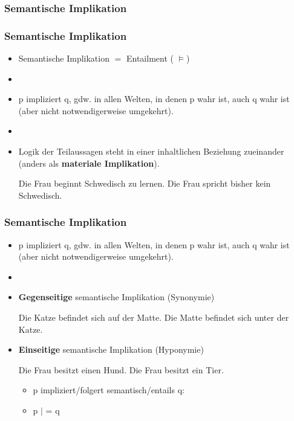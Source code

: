 %
\subsubsection{Semantische Implikation}
%

\begin{frame}
\frametitle{Semantische Implikation}

\begin{itemize}
	\item Semantische Implikation  $=$ Entailment ( $\vDash$)
	\item []
	\item p impliziert q, gdw. in allen Welten, in denen p wahr ist, auch q wahr ist (aber nicht notwendigerweise umgekehrt).
	\item[]
	\item Logik der Teilaussagen steht in einer inhaltlichen Beziehung zueinander (anders als \textbf{materiale Implikation}).


\eal
	\ex Die Frau beginnt Schwedisch zu lernen.
	\ex Die Frau spricht bisher kein Schwedisch.
\zl

\end{itemize}

\end{frame}



\begin{frame}
\frametitle{Semantische Implikation}

\begin{itemize}
	\item p impliziert q, gdw. in allen Welten, in denen p wahr ist, auch q wahr ist (aber nicht notwendigerweise umgekehrt).
	\item[]
	\item \textbf{Gegenseitige} semantische Implikation (\ras Synonymie)
	
	\eal
		\ex Die Katze befindet sich auf der Matte.
		\ex Die Matte befindet sich unter der Katze.
	\zl
	
	\item \textbf{Einseitige} semantische Implikation (\ras Hyponymie)
	
	
	\eal
		\ex Die Frau besitzt einen Hund.
		\ex Die Frau besitzt ein Tier.
	\zl
	
	\begin{itemize}
		\item p impliziert/folgert semantisch/entails q:
		\item p $|$ = q
	\end{itemize}
	
\end{itemize}

\end{frame}


